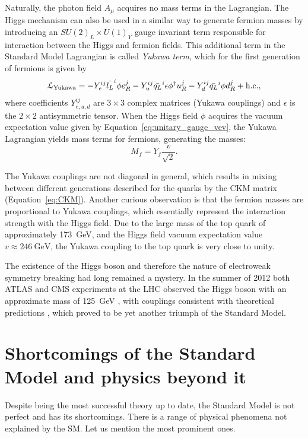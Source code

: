 Naturally, the photon field $A_\mu$ acquires no mass terms in the Lagrangian. The Higgs mechanism can also be used in a
similar way to generate fermion masses by introducing an $SU(2)_L \times U(1)_Y$ gauge invariant term responsible for
interaction between the Higgs and fermion fields. This additional term in the Standard Model Lagrangian is called
\textit{Yukawa term}, which for the first generation of fermions is given by
\begin{equation}
\mathcal{L}_\textrm{Yukawa} = -Y_e^{ij} \bar{l_L}^i \phi e_R^j - Y_u^{ij} \bar{q_L}^i \epsilon \phi^\dag u_R^j - Y_d^{ij}
\bar{q_L}^i \phi d_R^j + \textrm{h.c.},
\end{equation}
where coefficients $Y_{e,u,d}^{ij}$ are $3\times3$ complex matrices (Yukawa couplings) and $\epsilon$ is the $2\times2$
antisymmetric tensor. When the Higgs field $\phi$ acquires the vacuum expectation value given by
Equation~\ref{eq:unitary_gauge_vev}, the Yukawa Lagrangian yields mass terms for fermions, generating the masses:
\begin{equation}
M_f = Y_f \frac{v}{\sqrt{2}}.
\end{equation}

The Yukawa couplings are not diagonal in general, which results in mixing between different generations described for
the quarks by the CKM matrix (Equation~\ref{eq:CKM}). Another curious observation is that the fermion masses are
proportional to Yukawa couplings, which essentially represent the interaction strength with the Higgs field. Due to the
large mass of the top quark of approximately \SI{173}{\GeV}, and the Higgs field vacuum expectation value
$v\approx\SI{246}{\GeV}$, the Yukawa coupling to the top quark is very close to unity.

The existence of the Higgs boson and therefore the nature of electroweak symmetry breaking had long remained a mystery.
In the summer of 2012 both ATLAS and CMS experiments at the LHC observed the Higgs boson with an approximate mass of
\SI{125}{\GeV} \autocite{ATLAS_higgs_observation, CMS_higgs_observation}, with couplings consistent with theoretical
predictions \autocite{CMS_Higgs_long_paper, ATLAS_Higgs_couplings}, which proved to be yet another triumph of the
Standard Model.

\newpage
\section{Shortcomings of the Standard Model and physics beyond it}
\label{s:SM_shortcomings}
Despite being the most successful theory up to date, the Standard Model is not perfect and has its shortcomings. There
is a range of physical phenomena not explained by the SM. Let us mention the most prominent ones.

